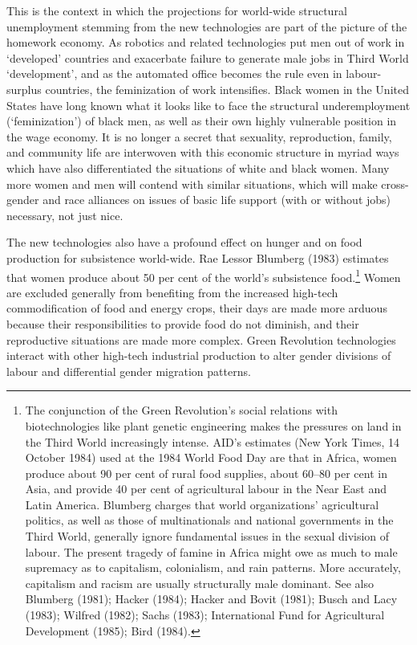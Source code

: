 \documentclass[DIV=12,%
               BCOR=10mm,%
               headinclude=false,%
               footinclude=false,open=any,%
               fontsize=11pt,%
               twoside,%
               paper=210mm:11in]%
               {scrbook}
\begin{document}
This is the context in which the projections for world-wide structural unemployment stemming from the new technologies are part of the picture of the homework economy. As robotics and related technologies put men out of work in ‘developed’ countries and exacerbate failure to generate male jobs in Third World ‘development’, and as the automated office becomes the rule even in labour-surplus countries, the feminization of work intensifies. Black women in the United States have long known what it looks like to face the structural underemployment (‘feminization’) of black men, as well as their own highly vulnerable position in the wage economy. It is no longer a secret that sexuality, reproduction, family, and community life are interwoven with this economic structure in myriad ways which have also differentiated the situations of white and black women. Many more women and men will contend with similar situations, which will make cross-gender and race alliances on issues of basic life support (with or without jobs) necessary, not just nice.


The new technologies also have a profound effect on hunger and on food production for subsistence world-wide. Rae Lessor Blumberg (1983) estimates that women produce about 50 per cent of the world’s subsistence food.\footnote{The conjunction of the Green Revolution’s social relations with biotechnologies like plant genetic engineering makes the pressures on land in the Third World increasingly intense. AID’s estimates (New York Times, 14 October 1984) used at the 1984 World Food Day are that in Africa, women produce about 90 per cent of rural food supplies, about 60–80 per cent in Asia, and provide 40 per cent of agricultural labour in the Near East and Latin America. Blumberg charges that world organizations’ agricultural politics, as well as those of multinationals and national governments in the Third World, generally ignore fundamental issues in the sexual division of labour. The present tragedy of famine in Africa might owe as much to male supremacy as to capitalism, colonialism, and rain patterns. More accurately, capitalism and racism are usually structurally male dominant. See also Blumberg (1981); Hacker (1984); Hacker and Bovit (1981); Busch and Lacy (1983); Wilfred (1982); Sachs (1983); International Fund for Agricultural Development (1985); Bird (1984).} Women are excluded generally from benefiting from the increased high-tech commodification of food and energy crops, their days are made more arduous because their responsibilities to provide food do not diminish, and their reproductive situations are made more complex. Green Revolution technologies interact with other high-tech industrial production to alter gender divisions of labour and differential gender migration patterns.
\end{document}

